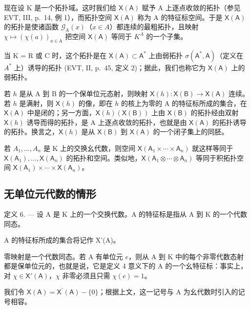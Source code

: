 现在设 K 是一个拓扑域。这时我们给 \(\mathsf{X}(\mathsf{A})\) 赋予 A 上逐点收敛的拓扑（参见 EVT, III, p.~14, 例 1），而拓扑空间 \(\mathsf{X}(\mathsf{A})\) 称为 A 的特征标空间。于是 \(\mathsf{X}(\mathsf{A})\) 的拓扑是使诸函数 \(\mathcal{G}_{\mathrm{A}}(x)\)（\(x \in A\)）都连续的最粗拓扑，且映射 \(\chi \mapsto (\chi(a))_{a \in \mathrm{A}}\) 把空间 \(\mathsf{X}(\mathsf{A})\) 等同于 \(K^{A}\) 的一个子集。

当 K = R 或 C 时，这个拓扑是在 \(\mathsf{X}(\mathsf{A}) \subset \mathsf{A}^{*}\) 上由弱拓扑 \(\sigma(\mathsf{A}^{*}, \mathsf{A})\)（定义在 \(A^{*}\) 上）诱导的拓扑 (EVT, II, p.~45, 定义 2)；据此，我们也称它为 \(\mathsf{X}(\mathsf{A})\) 上的弱拓扑。

若 \(h\) 是从 A 到 B 的一个保单位元态射，则映射 \(\mathsf{X}(h)\colon \mathsf{X}(\mathsf{B})\to \mathsf{X}(\mathsf{A})\) 连续。若 \(h\) 是满射，则 \(\mathsf{X}(h)\) 的像，即在 \(h\) 的核上为零的 A 的特征标所成的集合，在 \(\mathsf{X}(\mathsf{A})\) 中是闭的；另一方面，\(\mathsf{X}(h)(\mathsf{X}(\mathsf{B}))\) 上由 \(\mathsf{X}(\mathsf{B})\) 的拓扑经由双射 \(\mathsf{X}(h)\) 诱导而得的拓扑，是 A 上逐点收敛的拓扑，也就是由 \(\mathsf{X}(\mathsf{A})\) 的拓扑诱导的拓扑。换言之，\(\mathsf{X}(h)\) 是从 \(\mathsf{X}(\mathsf{B})\) 到 \(\mathsf{X}(\mathsf{A})\) 的一个闭子集上的同胚。

若 \(A_{1},\ldots,A_{n}\) 是 K 上的交换幺代数，则空间 \(\mathsf{X}(\mathsf{A}_{1}\times\cdots\times\mathsf{A}_{n})\) 就这样等同于 \(\mathsf{X}(\mathsf{A}_{1}),\ldots,\mathsf{X}(\mathsf{A}_{n})\) 的拓扑和空间。类似地，\(\mathsf{X}(\mathsf{A}_{1}\otimes\cdots\otimes\mathsf{A}_{n})\) 等同于积拓扑空间 \(\mathsf{X}(\mathsf{A}_{1})\times\cdots\times\mathsf{X}(\mathsf{A}_{n})\)。

\subsection{无单位元代数的情形}

定义 6. --- 设 A 是 K 上的一个交换代数。A 的特征标是指从 A 到 K 的一个代数同态。

A 的特征标所成的集合将记作 X'(A)。

零映射是一个代数同态。若 A 有单位元 \(e\)，则从 A 到 K 中的每个非零代数态射都是保单位元的，也就是说，它是定义 4 意义下的 A 的一个幺特征标：事实上，对 \(\chi \in \mathsf{X}'(\mathsf{A})\)，\(\chi\) 非零必须且只需 \(\chi(e) = 1\)。

我们令 \(\mathsf{X}(\mathsf{A})=\mathsf{X}^{\prime}(\mathsf{A})-\{0\}\)；根据上文，这一记号与 A 为幺代数时引入的记号相容。

